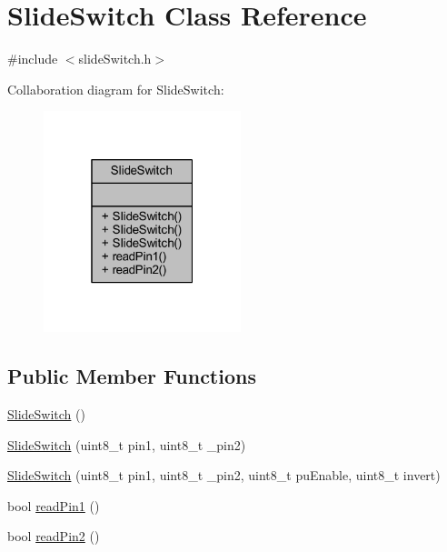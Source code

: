 \hypertarget{class_slide_switch}{}\section{Slide\+Switch Class Reference}
\label{class_slide_switch}


{\ttfamily \#include $<$slide\+Switch.\+h$>$}



Collaboration diagram for Slide\+Switch\+:
\nopagebreak
\begin{figure}[H]
\begin{center}
\leavevmode
\includegraphics[width=163pt]{da/d3b/class_slide_switch__coll__graph}
\end{center}
\end{figure}
\subsection*{Public Member Functions}
\begin{DoxyCompactItemize}
\item 
\hyperlink{class_slide_switch_a5b0ed9a670728dd2619eacc48a53d25f}{Slide\+Switch} ()
\item 
\hyperlink{class_slide_switch_a00c9284ec86c53602afd988faacb02a6}{Slide\+Switch} (uint8\+\_\+t pin1, uint8\+\_\+t \+\_\+pin2)
\item 
\hyperlink{class_slide_switch_a0806b870d5fb6bfb22b82b6f0146795e}{Slide\+Switch} (uint8\+\_\+t pin1, uint8\+\_\+t \+\_\+pin2, uint8\+\_\+t pu\+Enable, uint8\+\_\+t invert)
\item 
bool \hyperlink{class_slide_switch_a5c9f61ec4369f17e176d948ad74fc3ab}{read\+Pin1} ()
\item 
bool \hyperlink{class_slide_switch_ada186df3375d7dcd7dac6470c9832830}{read\+Pin2} ()
\end{DoxyCompactItemize}


